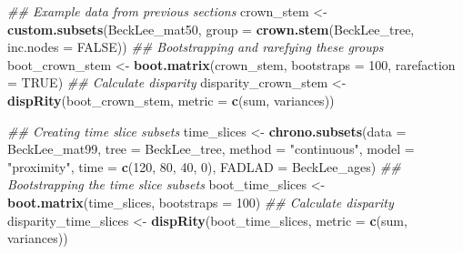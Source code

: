 \documentclass[
]{book}
\newenvironment{Shaded}{\begin{snugshade}}{\end{snugshade}}
\newcommand{\CommentTok}[1]{\textcolor[rgb]{0.56,0.35,0.01}{\textit{#1}}}
\newcommand{\DataTypeTok}[1]{\textcolor[rgb]{0.13,0.29,0.53}{#1}}
\newcommand{\DecValTok}[1]{\textcolor[rgb]{0.00,0.00,0.81}{#1}}
\newcommand{\KeywordTok}[1]{\textcolor[rgb]{0.13,0.29,0.53}{\textbf{#1}}}
\newcommand{\NormalTok}[1]{#1}
\newcommand{\OtherTok}[1]{\textcolor[rgb]{0.56,0.35,0.01}{#1}}
\newcommand{\StringTok}[1]{\textcolor[rgb]{0.31,0.60,0.02}{#1}}
\begin{document}
\begin{Shaded}
\begin{Highlighting}[]
\CommentTok{\#\# Example data from previous sections}
\NormalTok{crown\_stem \textless{}{-}}\StringTok{ }\KeywordTok{custom.subsets}\NormalTok{(BeckLee\_mat50,}
                             \DataTypeTok{group =} \KeywordTok{crown.stem}\NormalTok{(BeckLee\_tree,}
                             \DataTypeTok{inc.nodes =} \OtherTok{FALSE}\NormalTok{))}
\CommentTok{\#\# Bootstrapping and rarefying these groups}
\NormalTok{boot\_crown\_stem \textless{}{-}}\StringTok{ }\KeywordTok{boot.matrix}\NormalTok{(crown\_stem, }\DataTypeTok{bootstraps =} \DecValTok{100}\NormalTok{,}
                               \DataTypeTok{rarefaction =} \OtherTok{TRUE}\NormalTok{)}
\CommentTok{\#\# Calculate disparity}
\NormalTok{disparity\_crown\_stem \textless{}{-}}\StringTok{ }\KeywordTok{dispRity}\NormalTok{(boot\_crown\_stem,}
                                 \DataTypeTok{metric =} \KeywordTok{c}\NormalTok{(sum, variances))}

\CommentTok{\#\# Creating time slice subsets}
\NormalTok{time\_slices \textless{}{-}}\StringTok{ }\KeywordTok{chrono.subsets}\NormalTok{(}\DataTypeTok{data =}\NormalTok{ BeckLee\_mat99,}
                              \DataTypeTok{tree =}\NormalTok{ BeckLee\_tree,}
                              \DataTypeTok{method =} \StringTok{"continuous"}\NormalTok{,}
                              \DataTypeTok{model =} \StringTok{"proximity"}\NormalTok{,}
                              \DataTypeTok{time =} \KeywordTok{c}\NormalTok{(}\DecValTok{120}\NormalTok{, }\DecValTok{80}\NormalTok{, }\DecValTok{40}\NormalTok{, }\DecValTok{0}\NormalTok{),}
                              \DataTypeTok{FADLAD =}\NormalTok{ BeckLee\_ages)}
\CommentTok{\#\# Bootstrapping the time slice subsets}
\NormalTok{boot\_time\_slices \textless{}{-}}\StringTok{ }\KeywordTok{boot.matrix}\NormalTok{(time\_slices, }\DataTypeTok{bootstraps =} \DecValTok{100}\NormalTok{)}
\CommentTok{\#\# Calculate disparity}
\NormalTok{disparity\_time\_slices \textless{}{-}}\StringTok{ }\KeywordTok{dispRity}\NormalTok{(boot\_time\_slices,}
                                  \DataTypeTok{metric =} \KeywordTok{c}\NormalTok{(sum, variances))}


\end{Highlighting}
\end{Shaded}
\end{document}
